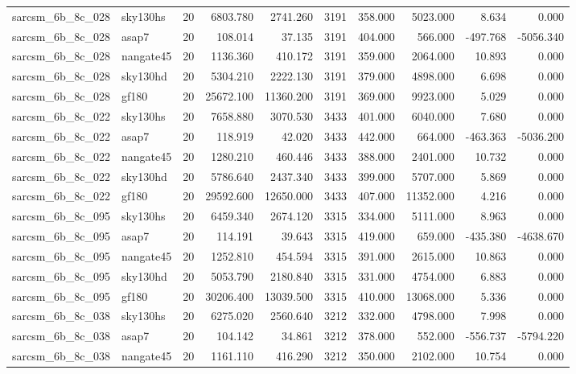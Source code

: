 \documentclass{article}
\begin{document}
\begin{longtable}{llrrrrrrrr}
sarcsm\_6b\_8c\_028 & sky130hs & 20 & 6803.780 & 2741.260 & 3191 & 358.000 & 5023.000 & 8.634 & 0.000 \\
sarcsm\_6b\_8c\_028 & asap7 & 20 & 108.014 & 37.135 & 3191 & 404.000 & 566.000 & -497.768 & -5056.340 \\
sarcsm\_6b\_8c\_028 & nangate45 & 20 & 1136.360 & 410.172 & 3191 & 359.000 & 2064.000 & 10.893 & 0.000 \\
sarcsm\_6b\_8c\_028 & sky130hd & 20 & 5304.210 & 2222.130 & 3191 & 379.000 & 4898.000 & 6.698 & 0.000 \\
sarcsm\_6b\_8c\_028 & gf180 & 20 & 25672.100 & 11360.200 & 3191 & 369.000 & 9923.000 & 5.029 & 0.000 \\
sarcsm\_6b\_8c\_022 & sky130hs & 20 & 7658.880 & 3070.530 & 3433 & 401.000 & 6040.000 & 7.680 & 0.000 \\
sarcsm\_6b\_8c\_022 & asap7 & 20 & 118.919 & 42.020 & 3433 & 442.000 & 664.000 & -463.363 & -5036.200 \\
sarcsm\_6b\_8c\_022 & nangate45 & 20 & 1280.210 & 460.446 & 3433 & 388.000 & 2401.000 & 10.732 & 0.000 \\
sarcsm\_6b\_8c\_022 & sky130hd & 20 & 5786.640 & 2437.340 & 3433 & 399.000 & 5707.000 & 5.869 & 0.000 \\
sarcsm\_6b\_8c\_022 & gf180 & 20 & 29592.600 & 12650.000 & 3433 & 407.000 & 11352.000 & 4.216 & 0.000 \\
sarcsm\_6b\_8c\_095 & sky130hs & 20 & 6459.340 & 2674.120 & 3315 & 334.000 & 5111.000 & 8.963 & 0.000 \\
sarcsm\_6b\_8c\_095 & asap7 & 20 & 114.191 & 39.643 & 3315 & 419.000 & 659.000 & -435.380 & -4638.670 \\
sarcsm\_6b\_8c\_095 & nangate45 & 20 & 1252.810 & 454.594 & 3315 & 391.000 & 2615.000 & 10.863 & 0.000 \\
sarcsm\_6b\_8c\_095 & sky130hd & 20 & 5053.790 & 2180.840 & 3315 & 331.000 & 4754.000 & 6.883 & 0.000 \\
sarcsm\_6b\_8c\_095 & gf180 & 20 & 30206.400 & 13039.500 & 3315 & 410.000 & 13068.000 & 5.336 & 0.000 \\
sarcsm\_6b\_8c\_038 & sky130hs & 20 & 6275.020 & 2560.640 & 3212 & 332.000 & 4798.000 & 7.998 & 0.000 \\
sarcsm\_6b\_8c\_038 & asap7 & 20 & 104.142 & 34.861 & 3212 & 378.000 & 552.000 & -556.737 & -5794.220 \\
sarcsm\_6b\_8c\_038 & nangate45 & 20 & 1161.110 & 416.290 & 3212 & 350.000 & 2102.000 & 10.754 & 0.000 \\

\end{longtable}
\end{document}
